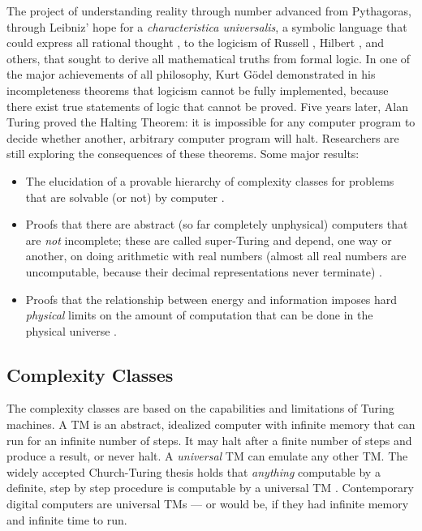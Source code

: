 \documentclass[]{interact}
\theoremstyle{plain}%
\theoremstyle{definition}
\theoremstyle{remark}
\begin{document}
The project of understanding reality through number advanced from Pythagoras, through Leibniz' 
hope for a \emph{characteristica universalis}, a symbolic language that could express all rational thought \citep{davis2018universal}, to the logicism of Russell \citep{sep-logicism}, Hilbert \citep{sep-hilbert-program}, and others, that sought to derive all mathematical truths from formal logic. In one of the major achievements of all philosophy, Kurt Gödel \citep{godel1986} demonstrated in his incompleteness theorems that logicism cannot be fully implemented, because there exist true statements of logic that cannot  be proved. Five years later, Alan Turing proved the Halting Theorem: it is impossible for any computer program to decide whether another, arbitrary computer program will halt. Researchers are still exploring the consequences of these theorems. Some major results:

\begin{itemize}
\item The elucidation of a provable hierarchy of complexity classes for problems that are solvable (or not) by computer \citep{arora2009computational}.
\item Proofs that there are abstract (so far completely unphysical) computers that are \emph{not} incomplete; these are called super-Turing and depend, one way or another, on doing arithmetic with real numbers (almost all real numbers are uncomputable, because their decimal representations never terminate) \citep{ord2006many}.
\item Proofs that the relationship between energy and information imposes hard \emph{physical} limits on the amount of computation that can be done in the physical universe \citep{aaronson2005npcomplete, sep-computation-physicalsystems}.
\end{itemize}

 \subsection{Complexity Classes} \label{sec:complexity}
 
 The complexity classes are based on the capabilities and limitations of Turing machines. A TM is an abstract, idealized computer with infinite memory that can run for an infinite number of steps. It may halt after a finite number of steps and produce a result, or never halt. A \emph{universal} TM can emulate any other TM. The widely accepted Church-Turing thesis holds that \emph{anything} computable by a definite, step by step procedure is computable by a universal TM \citep{sep-church-turing}. Contemporary digital computers are universal TMs --- or would be, if they had infinite memory and infinite time to run.
 
\end{document}
